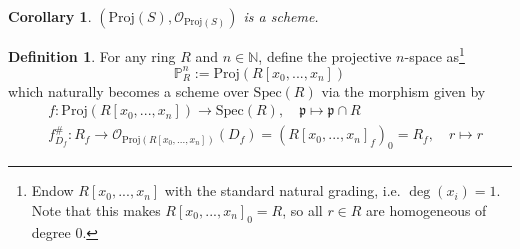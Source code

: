 \documentclass{scrartcl}
\newcommand{\N}{\mathbb{N}}
\renewcommand{\P}{\mathbb{P}}
\newcommand{\p}{\mathfrak{p}}
\newcommand{\Spec}{\mathrm{Spec}}
\newcommand{\Proj}{\mathrm{Proj}}
\renewcommand{\O}{\mathcal{O}}
\newtheorem{corollary}[prop]{Corollary}
\theoremstyle{definition}
\newtheorem{definition}[prop]{Definition}
\begin{document}
\begin{corollary}
    $(\Proj(S), \O_{\Proj(S)})$ is a scheme.
\end{corollary}
\begin{definition}
    For any ring $R$ and $n \in \N$, define the projective $n$-space as\footnote{Endow $R[x_0, ..., x_n]$ with the standard natural grading, i.e. $\deg(x_i) = 1$. Note that this makes $R[x_0, ..., x_n]_0 = R$, so all $r \in R$ are homogeneous of degree $0$.}
    \begin{equation*}
        \P_R^n := \Proj(R[x_0, ..., x_n])
    \end{equation*}
    which naturally becomes a scheme over $\Spec(R)$ via the morphism given by
    \begin{align*}
        &f: \Proj(R[x_0, ..., x_n]) \to \Spec(R), \quad \p \mapsto \p \cap R \\
        &f^\#_{D_f}: R_f \to \O_{\Proj(R[x_0, ..., x_n])}(D_f) = (R[x_0, ..., x_n]_f)_0 = R_f, \quad r \mapsto r
    \end{align*}
\end{definition}
\end{document}
